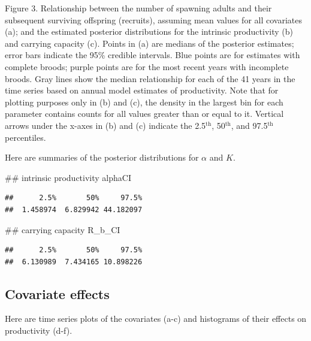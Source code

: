 \documentclass[11pt,]{article}
\newenvironment{Shaded}{}{}
\newcommand{\CommentTok}[1]{\textcolor[rgb]{0.00,0.50,0.00}{#1}}
\newcommand{\NormalTok}[1]{#1}
\begin{document}
Figure 3. Relationship between the number of spawning adults and their
subsequent surviving offspring (recruits), assuming mean values for all
covariates (a); and the estimated posterior distributions for the
intrinsic productivity (b) and carrying capacity (c). Points in (a) are
medians of the posterior estimates; error bars indicate the 95\%
credible intervals. Blue points are for estimates with complete broods;
purple points are for the most recent years with incomplete broods. Gray
lines show the median relationship for each of the 41 years in the time
series based on annual model estimates of productivity. Note that for
plotting purposes only in (b) and (c), the density in the largest bin
for each parameter contains counts for all values greater than or equal
to it. Vertical arrows under the x-axes in (b) and (c) indicate the
2.5\(^\text{th}\), 50\(^\text{th}\), and 97.5\(^\text{th}\) percentiles.

Here are summaries of the posterior distributions for \(\alpha\) and
\(K\).

\begin{Shaded}
\begin{Highlighting}[]
\CommentTok{## intrinsic productivity}
\NormalTok{alphaCI}
\end{Highlighting}
\end{Shaded}

\begin{verbatim}
##      2.5%       50%     97.5% 
##  1.458974  6.829942 44.182097
\end{verbatim}

\begin{Shaded}
\begin{Highlighting}[]
\CommentTok{## carrying capacity}
\NormalTok{R_b_CI}
\end{Highlighting}
\end{Shaded}

\begin{verbatim}
##      2.5%       50%     97.5% 
##  6.130989  7.434165 10.898226
\end{verbatim}

\hypertarget{covariate-effects}{%
\subsection{Covariate effects}\label{covariate-effects}}

Here are time series plots of the covariates (a-c) and histograms of
their effects on productivity (d-f).
\end{document}
